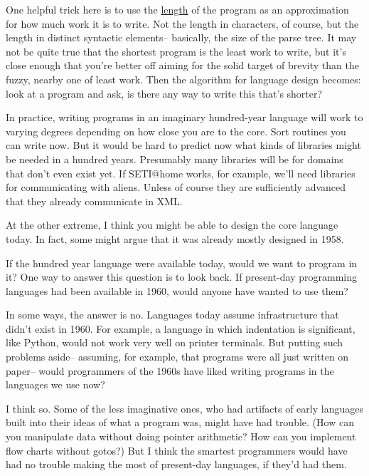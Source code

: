 One helpful trick here
is to use the \href{http://www.paulgraham.com/power.html}{length} of the program as an approximation for
how much work it is to write.  Not the length in characters,
of course, but the length in distinct syntactic elements-- basically,
the size of the parse tree.  It may not be quite true that
the shortest program is the least work to write, but it's
close enough that you're better off aiming for the solid
target of brevity than the fuzzy, nearby one of least work.
Then the algorithm for language design becomes: look at a program
and ask, is there any way to write this that's shorter?

In practice, writing programs in an imaginary hundred-year
language will work to varying degrees depending
on how close you are to the core.  Sort routines you can
write now.  But it would be
hard to predict now what kinds of libraries might be needed in
a hundred years.  Presumably many libraries will be for domains that
don't even exist yet.  If SETI@home works, for example, we'll  
need libraries for communicating with aliens.  Unless of course
they are sufficiently advanced that they already communicate
in XML.

At the other extreme, I think you might be able to design the
core language today.  In fact, some might argue that it was already
mostly designed in 1958.



If the hundred year language were available today, would we
want to program in it?  One way to answer this question is to
look back.  If present-day programming languages had been available
in 1960, would anyone have wanted to use them?

In some ways, the answer is no.  Languages today assume
infrastructure that didn't exist in 1960.  For example, a language
in which indentation is significant, like Python, would not
work very well on printer terminals.  But putting such problems
aside-- assuming, for example, that programs were all just
written on paper-- would programmers of the 1960s have liked
writing programs in the languages we use now?

I think so.
Some of the less imaginative ones,
who had artifacts of early languages built into their ideas of  
what a program was, might have had trouble.  (How can you manipulate
data without doing pointer arithmetic?  How can you implement 
flow charts without gotos?)  But I think the smartest programmers
would have had no trouble making the most of present-day
languages, if they'd had them.

